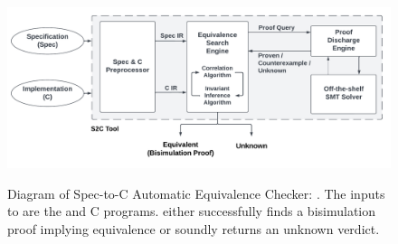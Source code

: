 \begin{figure}
\begin{center}
{\includegraphics[scale=0.495]{chapters/figures/figDiagram.pdf}}
\end{center}
\caption{\label{fig:diagram}Diagram of Spec-to-C Automatic Equivalence Checker: \toolName{}.
The inputs to \toolName{} are the \SpecL{} and C programs.
\toolName{} either successfully finds a bisimulation proof implying equivalence or
soundly returns an unknown verdict.}
\end{figure}